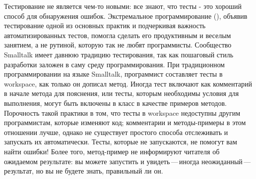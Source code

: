 \documentclass[a4paper,10pt,twoside]{book}
\begin{document}
Тестирование не является чем-то новыми: все знают, что
тесты - это хороший способ для обнаружения ошибок.
Экстремальное программирование (\mbox{}), объявив тестирование 
одной из основных практик и подчеркивая важность автоматизированных тестов, 
помогла сделать его продуктивным и веселым занятием, а не рутиной, 
которую так не любят программисты. 
Сообщество Smalltalk имеет давнюю традицию тестирования, так как пошаговый стиль разработки
заложен в саму среду программирования. При традиционном программировании на языке Smalltalk, программист составляет 
тесты в workspace, как только он дописал метод. 
Иногда тест включают как комментарий в начале метода для пояснения,
или тесты, которым необходимы условия для выполнения, могут быть включены в класс в качестве примеров методов.
Порочность такой практики в том, что тесты в workspace недоступны другим программистам,
которые изменяют код; комментарии и методы-примеры в этом отношении лучше,
однако не существует простого способа отслеживать и запускать их автоматически.
Тесты, которые не запускаются, не помогут вам найти ошибки!
Более того, метод-пример не информируют читателя об ожидаемом результате:
вы можете запустить и увидеть\,---\,иногда неожиданный\,---\,результат,
но вы не будете знать, правильный ли он.
\end{document}
